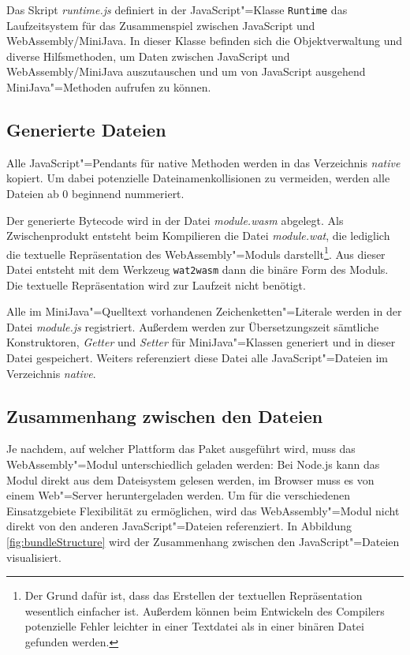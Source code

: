 Das Skript \emph{runtime.js} definiert in der JavaScript"=Klasse \lstinline{Runtime} das Laufzeitsystem für das Zusammenspiel zwischen JavaScript und WebAssembly/MiniJava. In dieser Klasse befinden sich die Objektverwaltung und diverse Hilfsmethoden, um Daten zwischen JavaScript und WebAssembly/MiniJava auszutauschen und um von JavaScript ausgehend MiniJava"=Methoden aufrufen zu können.

\subsection{Generierte Dateien}

Alle JavaScript"=Pendants für native Methoden werden in das Verzeichnis \emph{native} kopiert. Um dabei potenzielle Dateinamenkollisionen zu vermeiden, werden alle Dateien ab 0 beginnend nummeriert.

Der generierte Bytecode wird in der Datei \emph{module.wasm} abgelegt. Als Zwischenprodukt entsteht beim Kompilieren die Datei \emph{module.wat}, die lediglich die textuelle Repräsentation des WebAssembly"=Moduls darstellt\footnote{Der Grund dafür ist, dass das Erstellen der textuellen Repräsentation wesentlich einfacher ist. Außerdem können beim Entwickeln des Compilers potenzielle Fehler leichter in einer Textdatei als in einer binären Datei gefunden werden.}. Aus dieser Datei entsteht mit dem Werkzeug \lstinline{wat2wasm} \cite{WABT} dann die binäre Form des Moduls. Die textuelle Repräsentation wird zur Laufzeit nicht benötigt.

Alle im MiniJava"=Quelltext vorhandenen Zeichenketten"=Literale werden in der Datei \emph{module.js} registriert. Außerdem werden zur Übersetzungszeit sämtliche Konstruktoren, \emph{Getter} und \emph{Setter} für MiniJava"=Klassen generiert und in dieser Datei gespeichert. Weiters referenziert diese Datei alle JavaScript"=Dateien im Verzeichnis \emph{native}.

\subsection{Zusammenhang zwischen den Dateien}

Je nachdem, auf welcher Plattform das Paket ausgeführt wird, muss das WebAssembly"=Modul unterschiedlich geladen werden: Bei Node.js kann das Modul direkt aus dem Dateisystem gelesen werden, im Browser muss es von einem Web"=Server heruntergeladen werden. Um für die verschiedenen Einsatzgebiete Flexibilität zu ermöglichen, wird das WebAssembly"=Modul nicht direkt von den anderen JavaScript"=Dateien referenziert. In Abbildung \ref{fig:bundleStructure} wird der Zusammenhang zwischen den JavaScript"=Dateien visualisiert.

